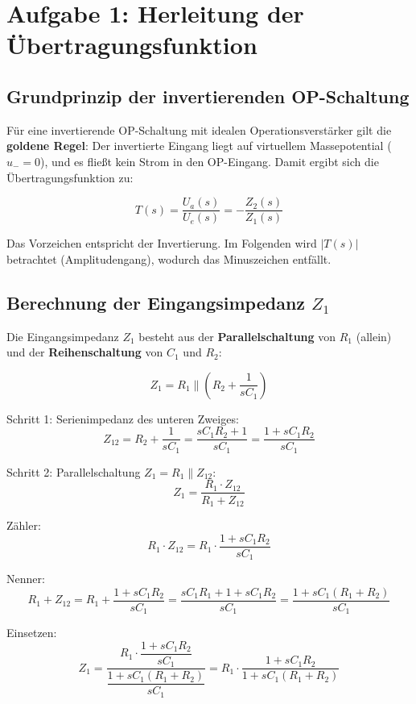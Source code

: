 \documentclass[12pt,a4paper]{article}
\begin{document}
\section{Aufgabe 1: Herleitung der Übertragungsfunktion}

\subsection{Grundprinzip der invertierenden OP-Schaltung}

Für eine invertierende OP-Schaltung mit idealen Operationsverstärker gilt die
\textbf{goldene Regel}: Der invertierte Eingang liegt auf virtuellem Massepotential
($u_- = 0$), und es fließt kein Strom in den OP-Eingang. Damit ergibt sich die
Übertragungsfunktion zu:

\begin{tcolorbox}[formel]
\[
  T(s) = \frac{U_a(s)}{U_e(s)} = -\frac{Z_2(s)}{Z_1(s)}
\]
\end{tcolorbox}

Das Vorzeichen entspricht der Invertierung. Im Folgenden wird $|T(s)|$ betrachtet
(Amplitudengang), wodurch das Minuszeichen entfällt.

\subsection{Berechnung der Eingangsimpedanz $Z_1$}

Die Eingangsimpedanz $Z_1$ besteht aus der \textbf{Parallelschaltung} von $R_1$
(allein) und der \textbf{Reihenschaltung} von $C_1$ und $R_2$:

\[
  Z_1 = R_1 \parallel \left(R_2 + \frac{1}{s C_1}\right)
\]

Schritt 1: Serienimpedanz des unteren Zweiges:
\[
  Z_{12} = R_2 + \frac{1}{sC_1} = \frac{sC_1 R_2 + 1}{sC_1}
           = \frac{1 + sC_1 R_2}{sC_1}
\]

Schritt 2: Parallelschaltung $Z_1 = R_1 \parallel Z_{12}$:
\[
  Z_1 = \frac{R_1 \cdot Z_{12}}{R_1 + Z_{12}}
\]

Zähler:
\[
  R_1 \cdot Z_{12} = R_1 \cdot \frac{1 + sC_1 R_2}{sC_1}
\]

Nenner:
\[
  R_1 + Z_{12} = R_1 + \frac{1 + sC_1 R_2}{sC_1}
               = \frac{sC_1 R_1 + 1 + sC_1 R_2}{sC_1}
               = \frac{1 + sC_1(R_1 + R_2)}{sC_1}
\]

Einsetzen:
\[
  Z_1 = \frac{R_1 \cdot \dfrac{1 + sC_1 R_2}{sC_1}}{\dfrac{1 + sC_1(R_1+R_2)}{sC_1}}
       = R_1 \cdot \frac{1 + sC_1 R_2}{1 + sC_1(R_1 + R_2)}
\]
\end{document}

